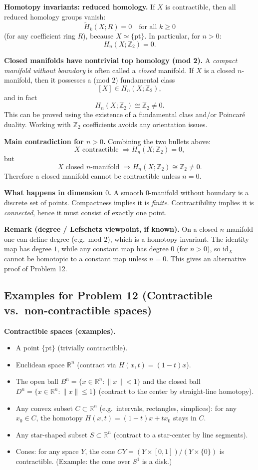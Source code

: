 \documentclass[12pt,a4paper]{article}
\theoremstyle{plain}
\theoremstyle{definition}      %
\begin{document}
\medskip
\noindent\textbf{Homotopy invariants: reduced homology.}
If $X$ is contractible, then all reduced homology groups vanish:
\[
\widetilde H_k(X;R)=0 \quad \text{for all } k\ge 0
\]
(for any coefficient ring $R$), because $X\simeq \{\mathrm{pt}\}$.
In particular, for $n>0$:
\[
H_n(X;\mathbb{Z}_2)=0.
\]

\medskip
\noindent\textbf{Closed manifolds have nontrivial top homology (mod 2).}
A \emph{compact manifold without boundary} is often called a \emph{closed} manifold.
If $X$ is a closed $n$-manifold, then it possesses a (mod $2$) fundamental class
\[
[X]\in H_n(X;\mathbb{Z}_2),
\]
and in fact
\[
H_n(X;\mathbb{Z}_2)\cong \mathbb{Z}_2 \neq 0.
\]
This can be proved using the existence of a fundamental class and/or Poincar\'e duality.
Working with $\mathbb{Z}_2$ coefficients avoids any orientation issues.

\medskip
\noindent\textbf{Main contradiction for $n>0$.}
Combining the two bullets above:
\[
X \text{ contractible } \Longrightarrow H_n(X;\mathbb{Z}_2)=0,
\]
but
\[
X \text{ closed $n$-manifold } \Longrightarrow H_n(X;\mathbb{Z}_2)\cong\mathbb{Z}_2\neq 0.
\]
Therefore a closed manifold cannot be contractible unless $n=0$.

\medskip
\noindent\textbf{What happens in dimension $0$.}
A smooth $0$-manifold without boundary is a discrete set of points.
Compactness implies it is \emph{finite}.
Contractibility implies it is \emph{connected}, hence it must consist of exactly one point.

\medskip
\noindent\textbf{Remark (degree / Lefschetz viewpoint, if known).}
On a closed $n$-manifold one can define degree (e.g.\ mod $2$), which is a homotopy invariant.
The identity map has degree $1$, while any constant map has degree $0$ (for $n>0$),
so $\mathrm{id}_X$ cannot be homotopic to a constant map unless $n=0$.
This gives an alternative proof of Problem 12.

\subsection*{Examples for Problem 12 (Contractible vs.\ non-contractible spaces)}

\noindent\textbf{Contractible spaces (examples).}
\begin{itemize}
	\item A point $\{\mathrm{pt}\}$ (trivially contractible).
	\item Euclidean space $\mathbb{R}^n$ (contract via $H(x,t)=(1-t)x$).
	\item The open ball $B^n=\{x\in\mathbb{R}^n:\|x\|<1\}$ and the closed ball
	$D^n=\{x\in\mathbb{R}^n:\|x\|\le 1\}$ (contract to the center by straight-line homotopy).
	\item Any convex subset $C\subset\mathbb{R}^n$ (e.g.\ intervals, rectangles, simplices):
	for any $x_0\in C$, the homotopy $H(x,t)=(1-t)x+tx_0$ stays in $C$.
	\item Any star-shaped subset $S\subset\mathbb{R}^n$ (contract to a star-center by line segments).
	\item Cones: for any space $Y$, the cone
	$CY=(Y\times[0,1])/(Y\times\{0\})$ is contractible.
	(Example: the cone over $S^1$ is a disk.)
\end{itemize}
\end{document}
